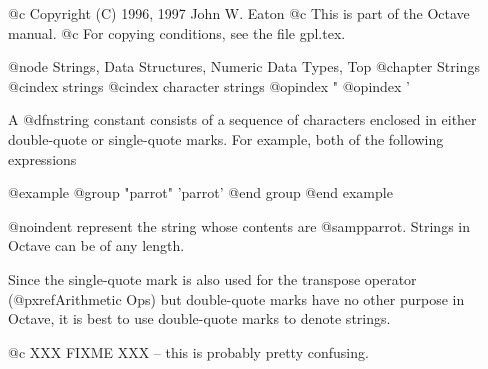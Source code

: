 @c Copyright (C) 1996, 1997 John W. Eaton
@c This is part of the Octave manual.
@c For copying conditions, see the file gpl.tex.

@node Strings, Data Structures, Numeric Data Types, Top
@chapter Strings
@cindex strings
@cindex character strings
@opindex "
@opindex '

A @dfn{string constant} consists of a sequence of characters enclosed in
either double-quote or single-quote marks.  For example, both of the
following expressions

@example
@group
"parrot"
'parrot'
@end group
@end example

@noindent
represent the string whose contents are @samp{parrot}.  Strings in
Octave can be of any length.

Since the single-quote mark is also used for the transpose operator
(@pxref{Arithmetic Ops}) but double-quote marks have no other purpose in
Octave, it is best to use double-quote marks to denote strings.

@c XXX FIXME XXX -- this is probably pretty confusing.

